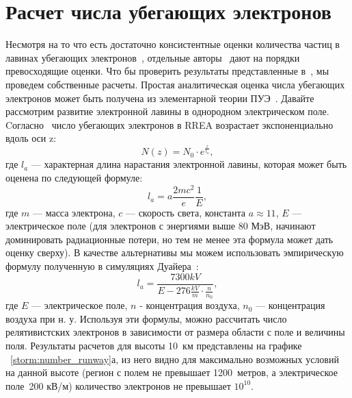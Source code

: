 \section{Расчет числа убегающих электронов}\label{sec:thunderstorm/rrea}
Несмотря на то что есть достаточно консистентные оценки количества частиц в лавинах убегающих электронов~\cite{moss2006, DwyerSmith2005, skeltved2014, Gurevich2001ufn, Dwyer2012}, отдельные авторы~\cite{Oreshkin_2018} дают на порядки превосходящие оценки. Что бы проверить результаты представленные в~\cite{Oreshkin_2018}, мы проведем собственные расчеты. Простая аналитическая оценка числа убегающих электронов может быть получена из элементарной теории ПУЭ~\cite{Gurevich2001ufn}. Давайте рассмотрим развитие электронной лавины в однородном электрическом поле. Cогласно~\cite{Gurevich2001ufn} число убегающих электронов в RREA возрастает экспоненциально вдоль оси z:
\begin{equation}
\label{storm:exp}
N(z) = N_0 \cdot e^{\frac{z}{l_a}},
\end{equation}
где $l_a$ --- характерная длина нарастания электронной лавины, которая может быть оценена по следующей формуле:
\begin{equation}
l_a = a\frac{2 m c^{2}}{e} \frac{1}{E},
\end{equation}
где $m$ --- масса электрона, $c$ --- скорость света, константа $a \approx 11$, $E$ --- электрическое поле (для электронов с энергиями выше 80 МэВ, начинают доминировать радиационные потери, но тем не менее эта формула может дать оценку сверху). В качестве альтернативы мы можем использовать эмпирическую формулу полученную в симуляциях Дуайера~\cite{Dwyer2007}:
\begin{equation}
\label{storm:dwyer}
l_a = \frac{7300 kV}{E - 276 \frac{kV}{m} \cdot \frac{n}{n_0}},
\end{equation}
где $E$ --- электрическое поле, $n$ - концентрация воздуха, $n_0$ --- концентрация воздуха при н. у. Используя эти формулы, можно рассчитать число релятивистских электронов в зависимости от размера области с поле и величины поля. Результаты расчетов для высоты 10~км представлены на графике ~\ref{storm:number_runway}а, из него видно для максимально возможных условий на данной высоте (регион с полем не превышает 1200~метров, а электрическое поле~200 кВ/м) количество электронов не превышает $10^{10}$.

